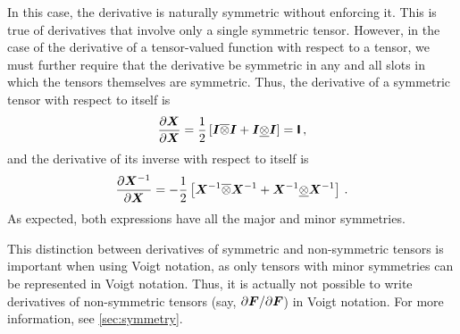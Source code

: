 \documentclass[10pt,letterpaper,oneside]{report}
\newcommand{\ten}[1]{\mbox{\boldmath $#1$}{}}
\newcommand{\tenf}[1]{\mbox{{\sffamily{\bfseries {#1}}}}}
\begin{document}
In this case, the derivative is naturally symmetric without enforcing it.  This is true of derivatives that involve only a single symmetric tensor.  However, in the case of the derivative of a tensor-valued function with respect to a tensor, we must further require that the derivative be symmetric in any and all slots in which the tensors themselves are symmetric.  Thus, the derivative of a symmetric tensor with respect to itself is
\begin{equation}
\frac{\partial \ten{X}}{\partial \ten{X}} = \frac{1}{2} \left[ \ten{I} \overline{\otimes} \ten{I} + \ten{I} \underline{\otimes} \ten{I} \right] = \tenf{I} \, , 
\end{equation}
and the derivative of its inverse with respect to itself is
\begin{equation}
\frac{\partial \ten{X}^{-1}}{\partial \ten{X}} = - \frac{1}{2} \left[ \ten{X}^{-1} \overline{\otimes} \ten{X}^{-1} + \ten{X}^{-1} \underline{\otimes} \ten{X}^{-1} \right] \, .
\end{equation}
As expected, both expressions have all the major and minor symmetries.  

This distinction between derivatives of symmetric and non-symmetric tensors is important when using Voigt notation, as only tensors with minor symmetries can be represented in Voigt notation.  Thus, it is actually not possible to write derivatives of non-symmetric tensors (say, $\partial \ten{F} / \partial \ten{F}$) in Voigt notation.  For more information, see \autoref{sec:symmetry}.
\end{document}
